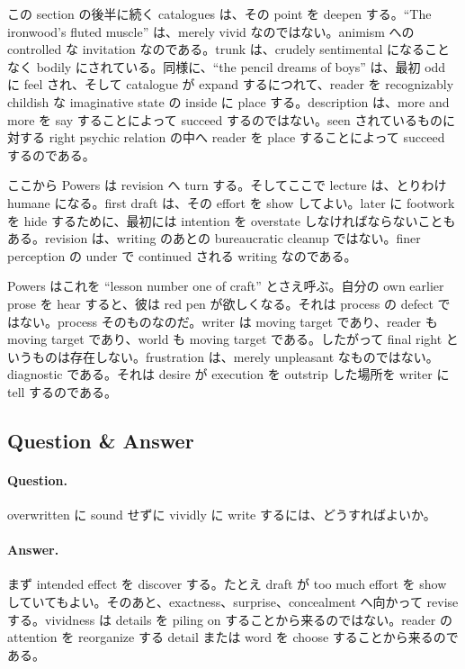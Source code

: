 この section の後半に続く catalogues は、その point を deepen する。``The ironwood's fluted muscle'' は、merely vivid なのではない。animism への controlled な invitation なのである。trunk は、crudely sentimental になることなく bodily にされている。同様に、``the pencil dreams of boys'' は、最初 odd に feel され、そして catalogue が expand するにつれて、reader を recognizably childish な imaginative state の inside に place する。description は、more and more を say することによって succeed するのではない。seen されているものに対する right psychic relation の中へ reader を place することによって succeed するのである。

ここから Powers は revision へ turn する。そしてここで lecture は、とりわけ humane になる。first draft は、その effort を show してよい。later に footwork を hide するために、最初には intention を overstate しなければならないこともある。revision は、writing のあとの bureaucratic cleanup ではない。finer perception の under で continued される writing なのである。

Powers はこれを ``lesson number one of craft'' とさえ呼ぶ。自分の own earlier prose を hear すると、彼は red pen が欲しくなる。それは process の defect ではない。process そのものなのだ。writer は moving target であり、reader も moving target であり、world も moving target である。したがって final right というものは存在しない。frustration は、merely unpleasant なものではない。diagnostic である。それは desire が execution を outstrip した場所を writer に tell するのである。

\subsection{Question \& Answer}

\paragraph{Question.} overwritten に sound せずに vividly に write するには、どうすればよいか。

\paragraph{Answer.} まず intended effect を discover する。たとえ draft が too much effort を show していてもよい。そのあと、exactness、surprise、concealment へ向かって revise する。vividness は details を piling on することから来るのではない。reader の attention を reorganize する detail または word を choose することから来るのである。

